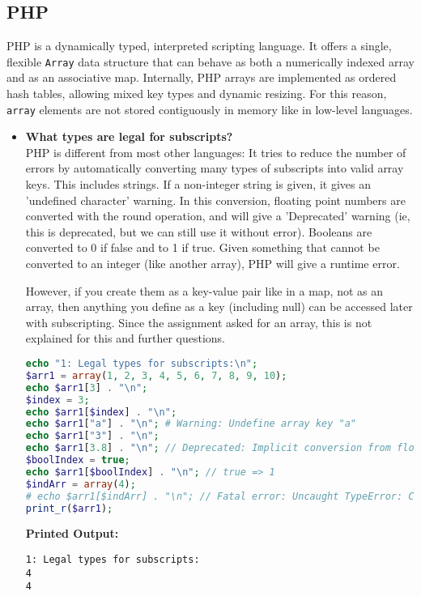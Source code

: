 \documentclass{article}
\begin{document}
\subsection{PHP}
PHP is a dynamically typed, interpreted scripting language. It offers a single, flexible \texttt{Array} data structure that can behave as both a numerically indexed array and as an associative map. Internally, PHP arrays are implemented as ordered hash tables, allowing mixed key types and dynamic resizing. For this reason, \texttt{array} elements are not stored contiguously in memory like in low-level languages.

\begin{itemize}

\item \textbf{What types are legal for subscripts?} \\
PHP is different from most other languages: It tries to reduce the number of errors by automatically converting many types of subscripts into valid array keys. This includes strings. If a non-integer string is given, it gives an 'undefined character' warning. In this conversion, floating point numbers are converted with the round operation, and will give a 'Deprecated' warning (ie, this is deprecated, but we can still use it without error). Booleans are converted to 0 if false and to 1 if true. Given something that cannot be converted to an integer (like another array), PHP will give a runtime error. 

However, if you create them as a key-value pair like in a map, not as an array, then anything you define as a key (including null) can be accessed later with subscripting. Since the assignment asked for an array, this is not explained for this and further questions.
\begin{lstlisting}[language=PHP]
echo "1: Legal types for subscripts:\n";
$arr1 = array(1, 2, 3, 4, 5, 6, 7, 8, 9, 10);
echo $arr1[3] . "\n";
$index = 3;
echo $arr1[$index] . "\n";
echo $arr1["a"] . "\n"; # Warning: Undefine array key "a"
echo $arr1["3"] . "\n";
echo $arr1[3.8] . "\n"; // Deprecated: Implicit conversion from float 3.8 to int loses precision on line 19
$boolIndex = true;
echo $arr1[$boolIndex] . "\n"; // true => 1
$indArr = array(4);
# echo $arr1[$indArr] . "\n"; // Fatal error: Uncaught TypeError: Cannot access offset of type array on array 
print_r($arr1);
\end{lstlisting}
\textbf{Printed Output:}
\begin{verbatim}
1: Legal types for subscripts:
4
4


\end{verbatim}
\end{itemize}
\end{document}
